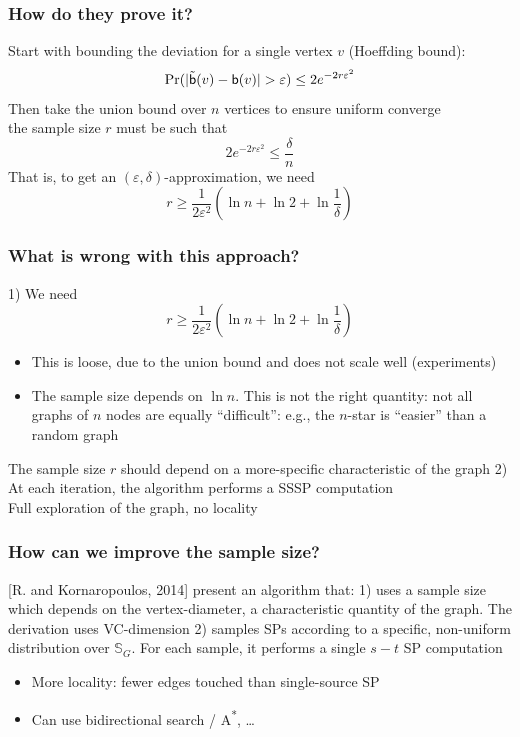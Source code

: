 \begin{frame}
  \frametitle{How do they prove it?}
  Start with bounding the deviation for a single vertex $v$ (Hoeffding bound):
  \[
    \Pr(|\tilde{\betw}(v)-\betw(v)|>\varepsilon)\le 2e^{-2r\varepsilon^2}
  \]
  \vfill
  Then take the union bound over $n$ vertices to ensure uniform converge\\
  \quad the sample size $r$ must be such that
  \[
    2e^{-2r\varepsilon^2}\le\frac{\delta}{n}
  \]
  That is, to get an $(\varepsilon,\delta)$-approximation, we need
  \[
    r\ge\frac{1}{2\varepsilon^2}\left(\ln n + \ln 2 +
    \ln\frac{1}{\delta}\right)
  \]
\end{frame}

\begin{frame}
  \frametitle{What is wrong with this approach?}
  1) We need
  \[
    r\ge\frac{1}{2\varepsilon^2}\left(\ln n + \ln 2 +
    \ln\frac{1}{\delta}\right)
  \]
  \begin{itemize}
    \item This is loose, due to the union bound and does not scale well (experiments)
    \item The sample size depends on $\ln n$. This is not the right
      quantity: not all graphs of $n$ nodes are equally ``difficult'': e.g., the $n$-star is ``easier'' than a random graph
  \end{itemize}
  The sample size $r$ should depend on a more-specific characteristic of the graph
  \vfill
  2) At each iteration, the algorithm performs a SSSP computation\\
  \quad Full exploration of the graph, no locality
\end{frame}

\begin{frame}
  \frametitle{How can we improve the sample size?}
  [R. and Kornaropoulos, 2014] present an algorithm that:
  \vfill
  1) uses a sample size which depends on the vertex-diameter, a characteristic
  quantity of the graph. The derivation uses VC-dimension
  \vfill
  2) samples SPs according to a specific, non-uniform distribution over
  $\mathbb{S}_G$. For each sample, it performs a single $s-t$ SP computation
    \begin{itemize}
      \item More locality: fewer edges touched than single-source SP
      \item Can use bidirectional search / A\textsuperscript{*},
        \ldots
      \end{itemize}
\end{frame}

